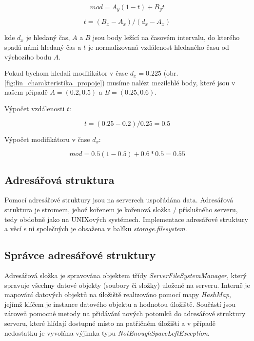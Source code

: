 \documentclass[czech,DP]{thesiskiv}
\begin{document}
\begin{equation}\label{eq:mod_lin}
mod = A_y(1 - t) + B_yt
\end{equation}

\begin{equation}
t = (B_x - A_x) / (d_x - A_x)
\end{equation}

\noindent kde $d_x$ je hledaný čas, $A$ a $B$ jsou body ležící na časovém intervalu, do kterého spadá námi hledaný čas a $t$ je normalizovaná vzdálenost hledaného času od výchozího bodu $A$.

Pokud bychom hledali modifikátor v čase $d_x = 0.225$ (obr. \ref{fig:lin_charakteristika_propoje}) musíme nalézt mezilehlé body, které jsou v našem případě $A = (0.2,0.5) $ a $B = (0.25, 0.6)$. 

\noindent Výpočet vzdálenosti $t$:

\begin{equation}
t = (0.25 - 0.2) / 0.25 = 0.5
\end{equation}

\noindent Výpočet modifikátoru v čase $d_x$:

\begin{equation}
mod = 0.5(1 - 0.5) + 0.6 * 0.5 = 0.55
\end{equation}

\subsection{Adresářová struktura}

Pomocí adresářové struktury jsou na serverech uspořádána data. Adresářová struktura je stromem, jehož kořenem je kořenová složka $/$ příslušného serveru, tedy obdobně jako na UNIXových systémech. Implementace adresářové struktury a věcí s ní společných je obsažena v balíku \textit{storage.filesystem}.

\subsection{Správce adresářové struktury}

Adresářová složka je spravována objektem třídy \textit{ServerFileSystemManager}, který spravuje všechny datové objekty (soubory či složky) uložené na serveru. Interně je mapování datových objektů na úložiště realizováno pomocí mapy \textit{HashMap}, jejímž klíčem je instance datového objektu a hodnotou úložiště. Součástí jsou zároveň pomocné metody na přidávání nových potomků do adresářové struktury serveru, které hlídají dostupné místo na patřičném úložišti a v případě nedostatku je vyvolána výjimka typu \textit{NotEnoughSpaceLeftException}.
\end{document}
